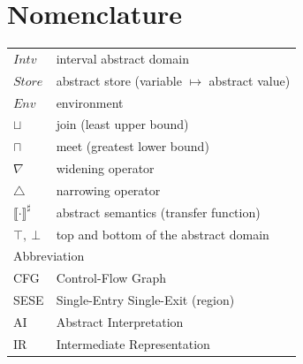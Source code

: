 \documentclass[11pt,oneside]{report}
\theoremstyle{plain}
\theoremstyle{definition}
\theoremstyle{remark}
\newcommand{\Env}{\mathit{Env}}
\newcommand{\absem}[1]{\llbracket #1 \rrbracket^{\sharp}}
\newcommand{\join}{\sqcup}
\newcommand{\meet}{\sqcap}
\newcommand{\widen}{\mathbin{\nabla}}
\newcommand{\narrow}{\mathbin{\triangle}}
\newcommand{\Intv}{\mathit{Intv}}
\newcommand{\Store}{\mathit{Store}}
\begin{document}
\newpage
{}
{}
\listoffigures

\newpage
{}
{}
\lstlistoflistings

\chapter*{Nomenclature}
\begin{tabular}{@{}p{}p{}@{}}
$\Intv$        & interval abstract domain\\
$\Store$       & abstract store (variable $\mapsto$ abstract value)\\
$\Env$         & environment\\
$\join$        & join (least upper bound)\\
$\meet$        & meet (greatest lower bound)\\
$\widen$       & widening operator\\
$\narrow$      & narrowing operator\\
$\absem{\cdot}$& abstract semantics (transfer function)\\
$\top,\ \bot$  & top and bottom of the abstract domain\\[20pt]
\multicolumn{2}{l}{Abbreviation}\\
CFG            & Control-Flow Graph\\
SESE           & Single-Entry Single-Exit (region)\\
AI             & Abstract Interpretation\\
IR             & Intermediate Representation\\
\end{tabular}

\clearpage
{}

\end{document}
